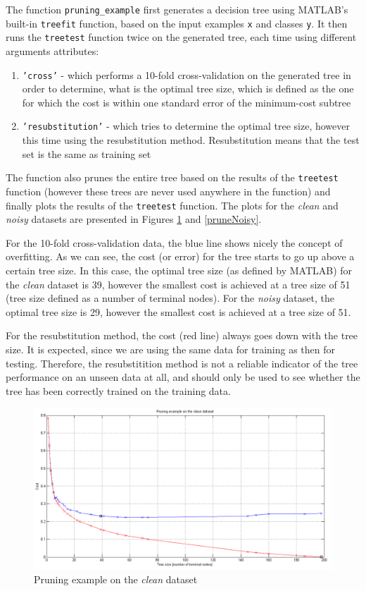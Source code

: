 \documentclass[a4paper]{article}
\begin{document}
The function \texttt{pruning\_example} first generates a decision tree using MATLAB's built-in \texttt{treefit} function, based on the input examples \texttt{x} and classes \texttt{y}. It then runs the \texttt{treetest} function twice on the generated tree, each time using different arguments attributes:
\begin{enumerate} \itemsep0pt \parskip0pt 
\item \texttt{'cross'} - which performs a 10-fold cross-validation on the generated tree in order to determine, what is the optimal tree size, which is defined as the one for which the cost is within one standard error of the minimum-cost subtree
\item \texttt{'resubstitution'} - which tries to determine the optimal tree size, however this time using the resubstitution method. Resubstitution means that the test set is the same as training set
\end{enumerate}
The function also prunes the entire tree based on the results of the \texttt{treetest} function (however these trees are never used anywhere in the function) and finally plots the results of the \texttt{treetest} function. The plots for the \emph{clean} and \emph{noisy} datasets are presented in Figures \ref{pruneClean} and \ref{pruneNoisy}. \medskip

For the 10-fold cross-validation data, the blue line shows nicely the concept of overfitting. As we can see, the cost (or error) for the tree starts to go up above a certain tree size. In this case, the optimal tree size (as defined by MATLAB) for the \emph{clean} dataset is 39, however the smallest cost is achieved at a tree size of 51 (tree size defined as a number of terminal nodes). For the \emph{noisy} dataset, the optimal tree size is 29, however the smallest cost is achieved at a tree size of 51.\medskip

For the resubstitution method, the cost (red line) always goes down with the tree size. It is expected, since we are using the same data for training as then for testing. Therefore, the resubstitition method is not a reliable indicator of the tree performance on an unseen data at all, and should only be used to see whether the tree has been correctly trained on the training data.

\begin{figure}[H]
\center
\includegraphics[width=1\columnwidth]{pruneClean} %
\caption{Pruning example on the \emph{clean} dataset}
\label{pruneClean}
\end{figure}
\end{document}
